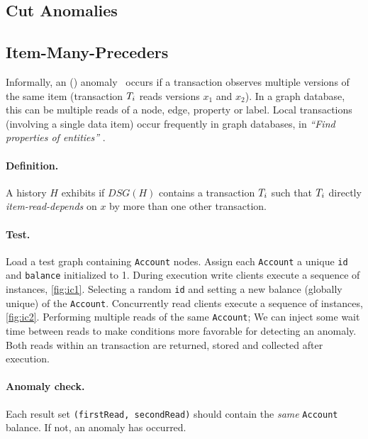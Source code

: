 \subsection{Cut Anomalies}

\subsection*{Item-Many-Preceders}
\label{sec:cut-anomalies}

Informally, an  ()
anomaly~\cite{DBLP:journals/pvldb/BailisDFGHS13} occurs if a transaction observes
multiple versions of the same item (\eg transaction $T_i$ reads versions
$x_1$ and $x_2$). In a graph database, this can be multiple reads of a node, edge,
property or label. Local transactions (involving a single data item) occur
frequently in graph databases, \eg in \emph{``Find properties of entities''}
.

\paragraph{Definition.}
A history $H$ exhibits  if $\textit{DSG}(H)$ contains a transaction
$T_i$ such that $T_i$ directly \emph{item-read-depends} on $x$ by more
than one other transaction.

\paragraph{Test.}
Load a test graph containing \texttt{Account} nodes. Assign each \texttt{Account}
a unique \texttt{id} and \texttt{balance} initialized to 1. During execution
write clients execute a sequence of  instances, \autoref{fig:ic1}.
Selecting a random \texttt{id} and setting a new balance (globally unique) of the
\texttt{Account}. Concurrently read clients execute a sequence of 
instances, \autoref{fig:ic2}. Performing multiple reads of the same \texttt{Account};
We can inject some wait time between reads to make conditions more favorable
for detecting an anomaly. Both reads within an 
transaction are returned, stored and collected after execution.

\paragraph{Anomaly check.}
Each  result set \texttt{(firstRead, secondRead)} should
contain the \emph{same} \texttt{Account} balance. If not, an 
anomaly has occurred.

